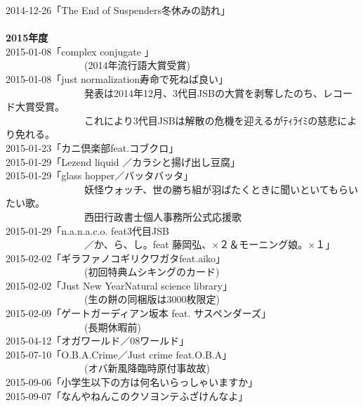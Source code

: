 2014-12-26「The End of Suspenders冬休みの訪れ」\\
 \\
{\large{\bf 2015年度}}\\
2015-01-08「complex conjugate 」\\
 \ \ \ \ \ \ \ \ \ \ \ \ \ \ \ \ (2014年流行語大賞受賞) \\
2015-01-08「just normalization寿命で死ねば良い」\\
 \ \ \ \ \ \ \ \ \ \ \ \ \ \ \ \ 発表は2014年12月、3代目JSBの大賞を剥奪したのち、レコード大賞受賞。\\
  \ \ \ \ \ \ \ \ \ \ \ \ \ \ \ \ これにより3代目JSBは解散の危機を迎えるがﾃｨﾗｲﾐの慈悲により免れる。\\
2015-01-23「カニ倶楽部feat.コブクロ」 \\
2015-01-29「Lezend liquid ／カラシと揚げ出し豆腐」\\ 
2015-01-29「glass hopper／バッタバッタ」\\
 \ \ \ \ \ \ \ \ \ \ \ \ \ \ \ \ 妖怪ウォッチ、世の勝ち組が羽ばたくときに聞いといてもらいたい歌。\\
  \ \ \ \ \ \ \ \ \ \ \ \ \ \ \ \ 西田行政書士個人事務所公式応援歌\\
2015-01-29「n.a.n.a.c.o. feat3代目JSB\\
 \ \ \ \ \ \ \ \ \ \ \ \ \ \ \ \ ／か、ら、し。feat 藤岡弘、$\times$２＆モーニング娘。$\times$１」 \\
2015-02-02「ギラファノコギリクワガタfeat.aiko」\\
 \ \ \ \ \ \ \ \ \ \ \ \ \ \ \ \ (初回特典ムシキングのカード) \\
2015-02-02「Just New YearNatural science library」\\
 \ \ \ \ \ \ \ \ \ \ \ \ \ \ \ \ (生の餅の同梱版は3000枚限定)\\ 
2015-02-09「ゲートガーディアン坂本 feat. サスペンダーズ」\\
 \ \ \ \ \ \ \ \ \ \ \ \ \ \ \ \ (長期休暇前) \\
2015-04-12「オガワールド／08ワールド」 \\
2015-07-10「O.B.A.Crime／Just crime feat.O.B.A」\\
 \ \ \ \ \ \ \ \ \ \ \ \ \ \ \ \ (オバ新風降臨時原付事故故) \\
2015-09-06「小学生以下の方は何名いらっしゃいますか」 \\
2015-09-07「なんやねんこのクソヨンテふざけんなよ」\\
 \\
